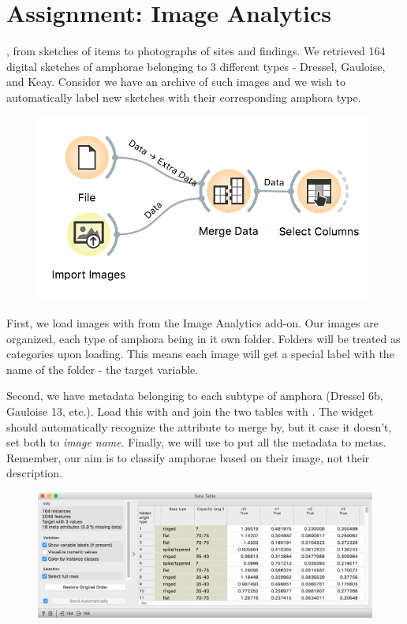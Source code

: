 \chapter{Assignment: Image Analytics}
\label{ch:arheo_image_analytics}

, from sketches of items to photographs of sites and findings. We retrieved 164 digital sketches of amphorae belonging to 3 different types - Dressel, Gauloise, and Keay. Consider we have an archive of such images and we wish to automatically label new sketches with their corresponding amphora type.

\begin{figure}
    \vspace{-0.5cm}
    \includegraphics[scale=0.6]{intermediate-workflow.png}
\end{figure}

First, we load images with  from the Image Analytics add-on. Our images are organized, each type of amphora being in it own folder. Folders will be treated as categories upon loading. This means each image will get a special label with the name of the folder - the target variable.

Second, we have metadata belonging to each subtype of amphora (Dressel 6b, Gauloise 13, etc.). Load this with  and join the two tables with . The widget should automatically recognize the attribute to merge by, but it case it doesn't, set both to \textit{image name}. Finally, we will use  to put all the metadata to metas. Remember, our aim is to classify amphorae based on their image, not their description.

\begin{figure}[h]
    \centering
    \includegraphics[width=\textwidth]{embeddings.png}
    \caption{$\;$} %
\end{figure}

